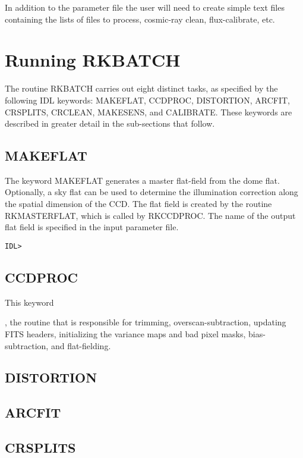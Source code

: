 \documentclass[preprint,11pt]{aastex}
\begin{document}
In addition to the parameter file the user will need to create simple
text files containing the lists of files to process, cosmic-ray clean,
flux-calibrate, etc.  

\section{Running RKBATCH}

The routine RKBATCH carries out eight distinct tasks, as specified by
the following IDL keywords: MAKEFLAT, CCDPROC, DISTORTION, ARCFIT,
CRSPLITS, CRCLEAN, MAKESENS, and CALIBRATE.  These keywords are
described in greater detail in the sub-sections that follow.

\subsection{MAKEFLAT}

The keyword MAKEFLAT generates a master flat-field from the dome flat.
Optionally, a sky flat can be used to determine the illumination
correction along the spatial dimension of the CCD.  The flat field is
created by the routine RKMASTERFLAT, which is called by RKCCDPROC.
The name of the output flat field is specified in the input parameter
file.

\begin{verbatim}
IDL> 

\end{verbatim}

\subsection{CCDPROC}

This keyword 

, the
routine that is responsible for trimming, overscan-subtraction,
updating FITS headers, initializing the variance maps and bad pixel
masks, bias-subtraction, and flat-fielding.  



\subsection{DISTORTION}



\subsection{ARCFIT}

\subsection{CRSPLITS}
\end{document}
